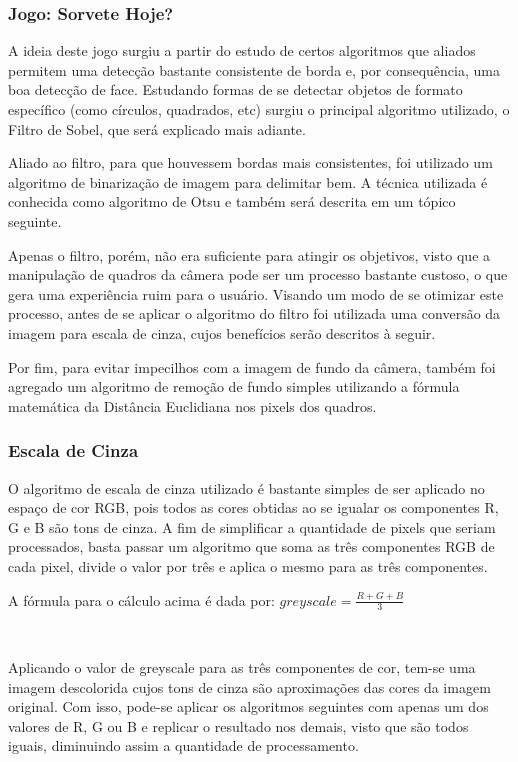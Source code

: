 \documentclass{sciposter}
\begin{document}
\begin{multicols}{3}
\subsubsection*{Jogo: Sorvete Hoje?}

A ideia deste jogo surgiu a partir do estudo de certos algoritmos que aliados permitem uma detecção bastante consistente de borda e, por consequência, uma boa detecção de face. Estudando formas de se detectar objetos de formato específico (como círculos, quadrados, etc) surgiu o principal algoritmo utilizado, o Filtro de Sobel, que será explicado mais adiante.

Aliado ao filtro, para que houvessem bordas mais consistentes, foi utilizado um algoritmo de binarização de imagem para delimitar bem. A técnica utilizada é conhecida como algoritmo de Otsu e também será descrita em um tópico seguinte.

Apenas o filtro, porém, não era suficiente para atingir os objetivos, visto que a manipulação de quadros da câmera pode ser um processo bastante custoso, o que gera uma experiência ruim para o usuário. Visando um modo de se otimizar este processo, antes de se aplicar o algoritmo do filtro foi utilizada uma conversão da imagem para escala de cinza, cujos benefícios serão descritos à seguir.

Por fim, para evitar impecilhos com a imagem de fundo da câmera, também foi agregado um algoritmo de remoção de fundo simples utilizando a fórmula matemática da Distância Euclidiana nos pixels dos quadros.

\subsubsection{Escala de Cinza}

O algoritmo de escala de cinza utilizado é bastante simples de ser aplicado no espaço de cor RGB, pois todos as cores obtidas ao se igualar os componentes R, G e B são tons de cinza. A fim de simplificar a quantidade de pixels que seriam processados, basta passar um algoritmo que soma as três componentes RGB de cada pixel, divide o valor por três e aplica o mesmo para as três componentes. \\

\begin{center}{A fórmula para o cálculo acima é dada por:}
$greyscale = \frac{R + G + B}{3}$ 
\end{center} \ \ 

Aplicando o valor de greyscale para as três componentes de cor, tem-se uma imagem descolorida cujos tons de cinza são aproximações das cores da imagem original. Com isso, pode-se aplicar os algoritmos seguintes com apenas um dos valores de R, G ou B e replicar o resultado nos demais, visto que são todos iguais, diminuindo assim a quantidade de processamento.


\end{multicols}
\end{document}
